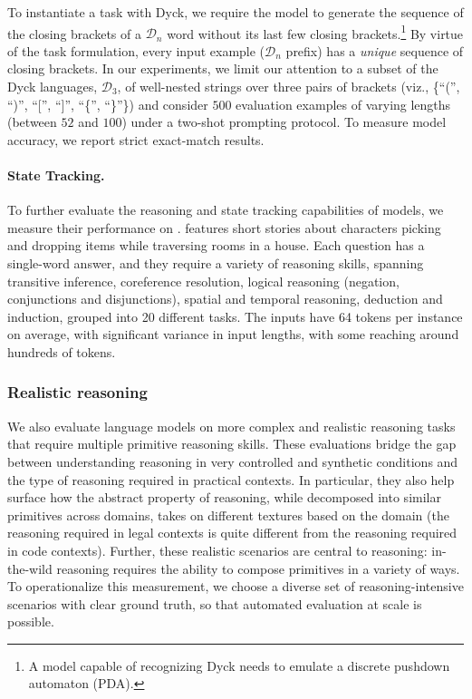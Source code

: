 To instantiate a task with Dyck, we require the model to generate the sequence of the closing brackets of a $\mathcal{D}_n$ word without its last few closing brackets.\footnote{A model capable of recognizing Dyck needs to emulate a discrete pushdown automaton (PDA).} 
By virtue of the task formulation, every input example (\ie  $\mathcal{D}_n$ prefix) has a \textit{unique} sequence of closing brackets. 
In our experiments, we limit our attention to a subset of the Dyck languages, $\mathcal{D}_3$, of well-nested strings over three pairs of brackets (viz., \{``('', ``)'', ``['', ``]'', ``\{'', ``\}''\}) and consider $500$ evaluation examples of varying lengths (between $52$ and $100$) under a two-shot prompting protocol. 
To measure model accuracy, we report strict exact-match results. 

\paragraph{State Tracking.} 
To further evaluate the reasoning and state tracking capabilities of models, we measure their performance on \babi \citep[][]{babi}. 
\babi features short stories about characters picking and dropping items while traversing rooms in a house. 
Each question has a single-word answer, and they require a variety of reasoning skills, spanning transitive inference, coreference resolution, logical reasoning (negation, conjunctions and disjunctions), spatial and temporal reasoning, deduction and induction, grouped into 20 different tasks. 
The inputs have 64 tokens per instance on average, with significant variance in input lengths, with some reaching around hundreds of tokens. 

\subsubsection{Realistic reasoning}
\label{sec:realistic-reasoning}
We also evaluate language models on more complex and realistic reasoning tasks that require multiple primitive reasoning skills. 
These evaluations bridge the gap between understanding reasoning in very controlled and synthetic conditions and the type of reasoning required in practical contexts.
In particular, they also help surface how the abstract property of reasoning, while decomposed into similar primitives across domains, takes on different textures based on the domain (\eg the reasoning required in legal contexts is quite different from the reasoning required in code contexts). 
Further, these realistic scenarios are central to reasoning: in-the-wild reasoning requires the ability to compose primitives in a variety of ways. 
To operationalize this measurement, we choose a diverse set of reasoning-intensive scenarios with clear ground truth, so that automated evaluation at scale is possible.

